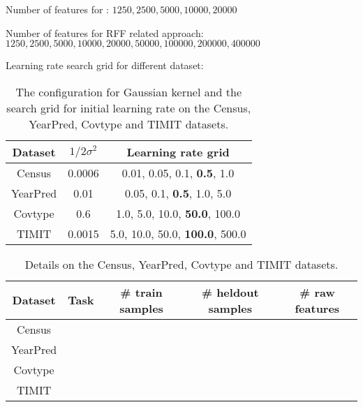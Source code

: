 Number of features for \Nystrom: $1250, 2500, 5000, 10000, 20000$

Number of features for RFF related approach: $1250, 2500, 5000, 10000, 20000, 50000, 100000, 200000, 400000$


Learning rate search grid for different dataset: 

\begin{table}
	\centering
	\begin{tabular}{c | c | c}
	\hline
	Dataset & $1/2\sigma^2$ & Learning rate grid \\
	\hline
	\hline
Census & 0.0006 & {0.01, 0.05, 0.1, \textbf{0.5}, 1.0} \\
YearPred & 0.01 & {0.05, 0.1, \textbf{0.5}, 1.0, 5.0} \\
Covtype & 0.6 & {1.0, 5.0, 10.0, \textbf{50.0}, 100.0} \\
TIMIT & 0.0015 & {5.0, 10.0, 50.0, \textbf{100.0}, 500.0} \\
	\hline
	\end{tabular}
	\caption{The configuration for Gaussian kernel and the search grid for initial learning rate on the Census, YearPred, Covtype and TIMIT datasets.}
	\label{tab:hyperparam}
\end{table}

\begin{table}
\centering
	\begin{tabular}{c | c | c | c | c }
	\hline
		Dataset & Task & \# train samples & \# heldout samples & \# raw features \\
	\hline
	\hline
		Census & & & & \\
		YearPred & & & & \\
		Covtype & & & &\\
		TIMIT & & & & \\
	\hline
	\end{tabular}
	\caption{Details on the Census, YearPred, Covtype and TIMIT datasets.}
\end{table}


